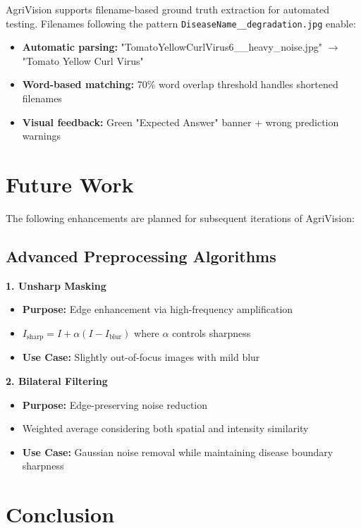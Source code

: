 \documentclass[12pt,a4paper]{article}
\begin{document}
AgriVision supports filename-based ground truth extraction for automated testing. Filenames following the pattern \texttt{DiseaseName\_\_degradation.jpg} enable:

\begin{itemize}
    \item \textbf{Automatic parsing:} "TomatoYellowCurlVirus6\_\_heavy\_noise.jpg" $\rightarrow$ "Tomato Yellow Curl Virus"
    \item \textbf{Word-based matching:} 70\% word overlap threshold handles shortened filenames
    \item \textbf{Visual feedback:} Green "Expected Answer" banner + wrong prediction warnings
\end{itemize}

\section*{Future Work}

The following enhancements are planned for subsequent iterations of AgriVision:

\subsection*{Advanced Preprocessing Algorithms}

\textbf{1. Unsharp Masking}
\begin{itemize}
    \item \textbf{Purpose:} Edge enhancement via high-frequency amplification
    \item $I_{\text{sharp}} = I + \alpha (I - I_{\text{blur}})$ where $\alpha$ controls sharpness
    \item \textbf{Use Case:} Slightly out-of-focus images with mild blur
\end{itemize}

\textbf{2. Bilateral Filtering}
\begin{itemize}
    \item \textbf{Purpose:} Edge-preserving noise reduction
    \item Weighted average considering both spatial and intensity similarity
    \item \textbf{Use Case:} Gaussian noise removal while maintaining disease boundary sharpness
\end{itemize}

\section*{Conclusion}
\end{document}
